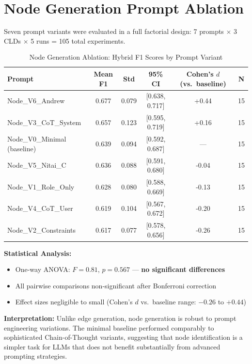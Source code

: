 \section{Node Generation Prompt Ablation}
\label{sec:ablation_node}

Seven prompt variants were evaluated in a full factorial design: 7 prompts $\times$ 3 CLDs $\times$ 5 runs = 105 total experiments.

\begin{table}[H]
\centering
\caption{Node Generation Ablation: Hybrid F1 Scores by Prompt Variant}
\label{tab:node_ablation}
\footnotesize
\begin{tabular}{@{}lccccc@{}}
\toprule
\textbf{Prompt} & \textbf{Mean F1} & \textbf{Std} & \textbf{95\% CI} & \textbf{Cohen's $d$ (vs.\ baseline)} & \textbf{N} \\
\midrule
Node\_V6\_Andrew & 0.677 & 0.079 & [0.638, 0.717] & +0.44 & 15 \\
Node\_V3\_CoT\_System & 0.657 & 0.123 & [0.595, 0.719] & +0.16 & 15 \\
Node\_V0\_Minimal (baseline) & 0.639 & 0.094 & [0.592, 0.687] & --- & 15 \\
Node\_V5\_Nitai\_C & 0.636 & 0.088 & [0.591, 0.680] & -0.04 & 15 \\
Node\_V1\_Role\_Only & 0.628 & 0.080 & [0.588, 0.669] & -0.13 & 15 \\
Node\_V4\_CoT\_User & 0.619 & 0.104 & [0.567, 0.672] & -0.20 & 15 \\
Node\_V2\_Constraints & 0.617 & 0.077 & [0.578, 0.656] & -0.26 & 15 \\
\bottomrule
\end{tabular}
\end{table}

\textbf{Statistical Analysis:}
\begin{itemize}[noitemsep]
    \item One-way ANOVA: $F = 0.81$, $p = 0.567$ --- \textbf{no significant differences}
    \item All pairwise comparisons non-significant after Bonferroni correction
    \item Effect sizes negligible to small (Cohen's $d$ vs.\ baseline range: $-0.26$ to $+0.44$)
\end{itemize}

\textbf{Interpretation:} Unlike edge generation, node generation is robust to prompt engineering variations. The minimal baseline performed comparably to sophisticated Chain-of-Thought variants, suggesting that node identification is a simpler task for LLMs that does not benefit substantially from advanced prompting strategies.

